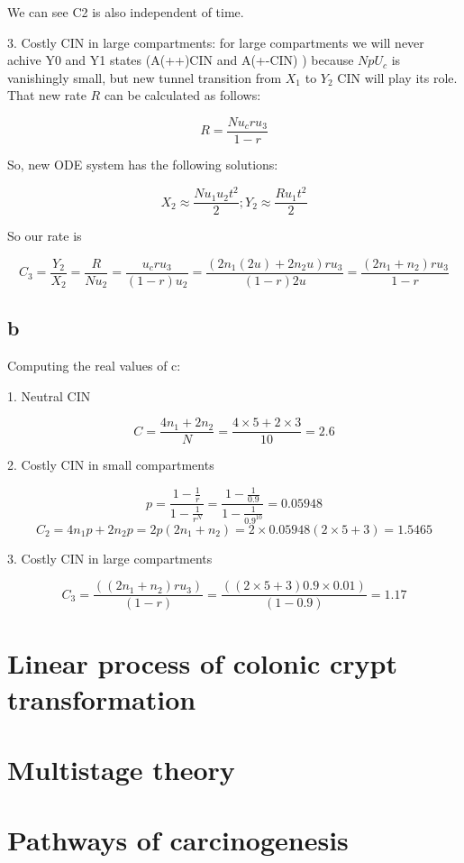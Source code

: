 We can see C2 is also independent of time.

3.	Costly CIN in large compartments: for large compartments we will never achive Y0 and Y1 states (A(++)CIN  and A(+-CIN) )  because $N p U_c$ is vanishingly small, but new tunnel transition from $X_1$ to $Y_2$ CIN will play its role. That new rate $R$ can be calculated as follows:

\[ R = \frac{Nu_cru_3}{1-r} \]

So, new ODE system has the following solutions:

\[ X_2 \approx \frac{Nu_1u_2t^2}{2} ; Y_2 \approx \frac{Ru_1t^2}{2} \]

So our rate is

\[ C_3 = \frac{Y_2}{X_2} = \frac{R}{Nu_2} = \frac{u_cru_3}{(1-r)u_2} = \frac{(2n_1(2u)+2n_2u)ru_3}{(1-r)2u} = \frac{(2n_1+n_2)ru_3}{1-r}\]

\subsection{b}
Computing the real values of c:

1. Neutral CIN

\[ C = \frac{4n_1+2n_2}{N} = \frac{4\times 5+2 \times 3}{10} = \boxed{2.6} \]

2. Costly CIN in small compartments

\[ p = \frac{1-\frac{1}{r}}{1 - \frac{1}{r^N}} = \frac{1-\frac{1}{0.9}}{1-\frac{1}{0.9^{10}}} = 0.05948  \]
\[ C_2 = 4n_1p+2n_2p = 2p(2n_1+n_2 )=2\times0.05948(2\times5+3)=\boxed{1.5465} \]

3. Costly CIN in large compartments

\[ C_3=\frac{((2n_1+n_2)ru_3)}{(1-r)}=\frac{((2\times5+3)0.9\times0.01)}{(1-0.9)}=\boxed{1.17} \]


\setcounter{chapter}{2}
\setcounter{section}{0}
\section{Linear process of colonic crypt transformation}

\setcounter{chapter}{3}
\setcounter{section}{0}
\section{Multistage theory}

\setcounter{chapter}{4}
\setcounter{section}{0}
\section{Pathways of carcinogenesis}
